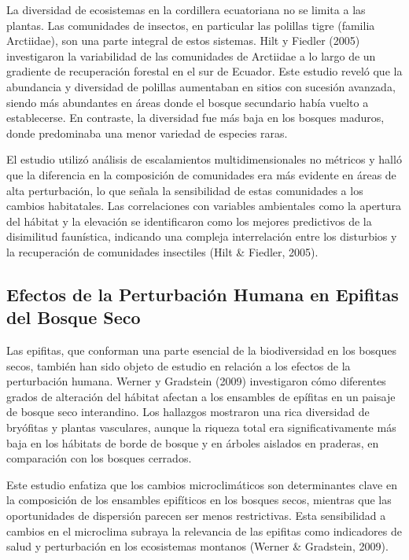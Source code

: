 \documentclass[
  letterpaper,
  DIV=11,
  numbers=noendperiod,
  oneside]{scrreprt}
\begin{document}
La diversidad de ecosistemas en la cordillera ecuatoriana no se limita a
las plantas. Las comunidades de insectos, en particular las polillas
tigre (familia Arctiidae), son una parte integral de estos sistemas.
Hilt y Fiedler (2005) investigaron la variabilidad de las comunidades de
Arctiidae a lo largo de un gradiente de recuperación forestal en el sur
de Ecuador. Este estudio reveló que la abundancia y diversidad de
polillas aumentaban en sitios con sucesión avanzada, siendo más
abundantes en áreas donde el bosque secundario había vuelto a
establecerse. En contraste, la diversidad fue más baja en los bosques
maduros, donde predominaba una menor variedad de especies raras.

El estudio utilizó análisis de escalamientos multidimensionales no
métricos y halló que la diferencia en la composición de comunidades era
más evidente en áreas de alta perturbación, lo que señala la
sensibilidad de estas comunidades a los cambios habitatales. Las
correlaciones con variables ambientales como la apertura del hábitat y
la elevación se identificaron como los mejores predictivos de la
disimilitud faunística, indicando una compleja interrelación entre los
disturbios y la recuperación de comunidades insectiles (Hilt \& Fiedler,
2005).

\subsection{Efectos de la Perturbación Humana en Epifitas del Bosque
Seco}\label{efectos-de-la-perturbaciuxf3n-humana-en-epifitas-del-bosque-seco}

Las epifitas, que conforman una parte esencial de la biodiversidad en
los bosques secos, también han sido objeto de estudio en relación a los
efectos de la perturbación humana. Werner y Gradstein (2009)
investigaron cómo diferentes grados de alteración del hábitat afectan a
los ensambles de epífitas en un paisaje de bosque seco interandino. Los
hallazgos mostraron una rica diversidad de bryófitas y plantas
vasculares, aunque la riqueza total era significativamente más baja en
los hábitats de borde de bosque y en árboles aislados en praderas, en
comparación con los bosques cerrados.

Este estudio enfatiza que los cambios microclimáticos son determinantes
clave en la composición de los ensambles epifíticos en los bosques
secos, mientras que las oportunidades de dispersión parecen ser menos
restrictivas. Esta sensibilidad a cambios en el microclima subraya la
relevancia de las epifitas como indicadores de salud y perturbación en
los ecosistemas montanos (Werner \& Gradstein, 2009).
\end{document}
